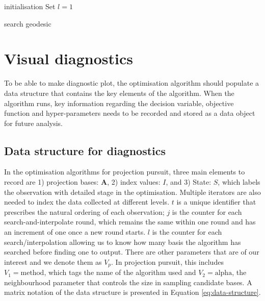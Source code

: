 \documentclass[12pt]{article}
\begin{document}
\begin{algorithm}
\SetAlgoLined
{}
  initialisation\;
  Set $l = 1$\;
  \caption{search geodesic}
  \label{search-geodesic}
\end{algorithm}

\newpage

\hypertarget{vis-diag}{%
\section{Visual diagnostics}\label{vis-diag}}

To be able to make diagnostic plot, the optimisation algorithm should
populate a data structure that contains the key elements of the
algorithm. When the algorithm runs, key information regarding the
decision variable, objective function and hyper-parameters needs to be
recorded and stored as a data object for future analysis.

\hypertarget{data-structure-for-diagnostics}{%
\subsection{Data structure for
diagnostics}\label{data-structure-for-diagnostics}}

In the optimisation algorithms for projection pursuit, three main
elements to record are 1) projection bases: \(\mathbf{A}\), 2) index
values: \(I\), and 3) State: \(S\), which labels the observation with
detailed stage in the optimisation. Multiple iterators are also needed
to index the data collected at different levels. \(t\) is a unique
identifier that prescribes the natural ordering of each observation;
\(j\) is the counter for each search-and-interpolate round, which
remains the same within one round and has an increment of one once a new
round starts. \(l\) is the counter for each search/interpolation
allowing us to know how many basis the algorithm has searched before
finding one to output. There are other parameters that are of our
interest and we denote them as \emph{\(V_{p}\)}. In projection pursuit,
this includes \(V_1 = \text{method}\), which tags the name of the
algorithm used and \(V_2 = \text{alpha}\), the neighbourhood parameter
that controls the size in sampling candidate bases. A matrix notation of
the data structure is presented in Equation \ref{eq:data-structure}.
\end{document}
